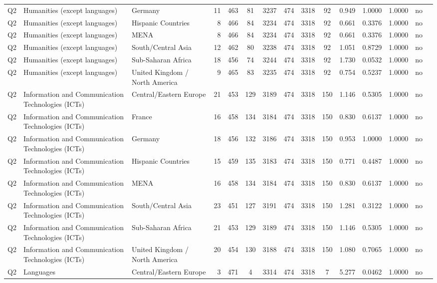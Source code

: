 \begin{longtable}{lllrcccccccccll}
Q2 & Humanities (except languages) & Germany & 11 & 463 & 81 & 3237 & 474 & 3318 & 92 & 0.949 & 1.0000 & 1.0000 & no \\
Q2 & Humanities (except languages) & Hispanic Countries & 8 & 466 & 84 & 3234 & 474 & 3318 & 92 & 0.661 & 0.3376 & 1.0000 & no \\
Q2 & Humanities (except languages) & MENA & 8 & 466 & 84 & 3234 & 474 & 3318 & 92 & 0.661 & 0.3376 & 1.0000 & no \\
Q2 & Humanities (except languages) & South/Central Asia & 12 & 462 & 80 & 3238 & 474 & 3318 & 92 & 1.051 & 0.8729 & 1.0000 & no \\
Q2 & Humanities (except languages) & Sub-Saharan Africa & 18 & 456 & 74 & 3244 & 474 & 3318 & 92 & 1.730 & 0.0532 & 1.0000 & no \\
Q2 & Humanities (except languages) & United Kingdom / North America & 9 & 465 & 83 & 3235 & 474 & 3318 & 92 & 0.754 & 0.5237 & 1.0000 & no \\
Q2 & Information and Communication Technologies (ICTs) & Central/Eastern Europe & 21 & 453 & 129 & 3189 & 474 & 3318 & 150 & 1.146 & 0.5305 & 1.0000 & no \\
Q2 & Information and Communication Technologies (ICTs) & France & 16 & 458 & 134 & 3184 & 474 & 3318 & 150 & 0.830 & 0.6137 & 1.0000 & no \\
Q2 & Information and Communication Technologies (ICTs) & Germany & 18 & 456 & 132 & 3186 & 474 & 3318 & 150 & 0.953 & 1.0000 & 1.0000 & no \\
Q2 & Information and Communication Technologies (ICTs) & Hispanic Countries & 15 & 459 & 135 & 3183 & 474 & 3318 & 150 & 0.771 & 0.4487 & 1.0000 & no \\
Q2 & Information and Communication Technologies (ICTs) & MENA & 16 & 458 & 134 & 3184 & 474 & 3318 & 150 & 0.830 & 0.6137 & 1.0000 & no \\
Q2 & Information and Communication Technologies (ICTs) & South/Central Asia & 23 & 451 & 127 & 3191 & 474 & 3318 & 150 & 1.281 & 0.3122 & 1.0000 & no \\
Q2 & Information and Communication Technologies (ICTs) & Sub-Saharan Africa & 21 & 453 & 129 & 3189 & 474 & 3318 & 150 & 1.146 & 0.5305 & 1.0000 & no \\
Q2 & Information and Communication Technologies (ICTs) & United Kingdom / North America & 20 & 454 & 130 & 3188 & 474 & 3318 & 150 & 1.080 & 0.7065 & 1.0000 & no \\
Q2 & Languages & Central/Eastern Europe & 3 & 471 & 4 & 3314 & 474 & 3318 & 7 & 5.277 & 0.0462 & 1.0000 & no \\

\end{longtable}
